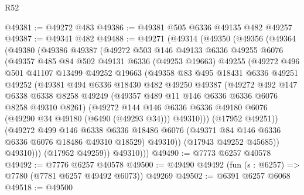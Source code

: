 \begin{lexlean}{R52}
\begin{coremodule}
@49381 := @49272 @483
@49386 := @49381 @505 @6336 @49135 @482 @49257
@49387 := @49341 @482
@49488 := @49271
    (@49314
      (@49350
        (@49356
          (@49364
            (@49380
              (@49386
                @49387
                (@49272
                  @503
                  @146
                  @49133
                  @6336
                  @49255
                  @6076
                  (@49357
                    @485
                    @84
                    @502
                    @49131
                    @6336
                    (@49253 @19663)
                    @49255
                    (@49272
                      @496
                      @501
                      @41107
                      @13499
                      @49252
                      @19663
                      (@49358
                        @83
                        @495
                        @18431
                        @6336
                        @49251
                        @49252
                        (@49381
                          @494
                          @6336
                          @18430
                          @482
                          @49250
                          @49387
                          (@49272
                            @492
                            @147
                            @6338
                            @6338
                            @8258
                            @49249
                            (@49357 @489 @11 @146 @6336 @6336 @6076 @8258 @49310 @8261)
                            (@49272
                              @144
                              @146
                              @6336
                              @6336
                              @49180
                              @6076
                              (@49290 @34 @49180 (@6490 (@49293 @34)))
                              @49310)))
                        (@17952 @49251))
                      (@49272
                        @499
                        @146
                        @6338
                        @6336
                        @18486
                        @6076
                        (@49371 @84 @146 @6336 @6336 @6076 @18486 @49310 @18529)
                        @49310))
                    (@17943 @49252 @45685))
                  @49310)))
            (@17952 @49259))
          @49310)))
@49490 := @7773 @6257 @40578
@49492 := @7776 @6257 @40578
@49500 := @49490 @49492 (fun (s : @6257) => @7780 (@7781 @6257 @49492 @6073)) @49269
@49502 := @6391 @6257 @6068
@49518 := @49500

\end{coremodule}
\end{lexlean}
